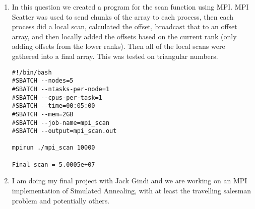 \documentclass{article}
\begin{document}
\begin{enumerate}
    \item In this question we created a program for the scan function using MPI.  MPI 
Scatter was used to send chunks of the array to each process, then each process did a 
local scan, calculated the offset, broadcast that to an offset array, and then locally 
added the offsets based on the current rank (only adding offsets from the lower ranks).  
Then all of the local scans were gathered into a final array.  This was tested on 
triangular numbers.

    \begin{verbatim}
#!/bin/bash
#SBATCH --nodes=5
#SBATCH --ntasks-per-node=1
#SBATCH --cpus-per-task=1
#SBATCH --time=00:05:00
#SBATCH --mem=2GB
#SBATCH --job-name=mpi_scan
#SBATCH --output=mpi_scan.out

mpirun ./mpi_scan 10000
    
Final scan = 5.0005e+07
    \end{verbatim}

    \item I am doing my final project with Jack Gindi and we are working on an MPI 
implementation of Simulated Annealing, with at least the travelling salesman problem 
and potentially others.  
\end{enumerate}
\end{document}
